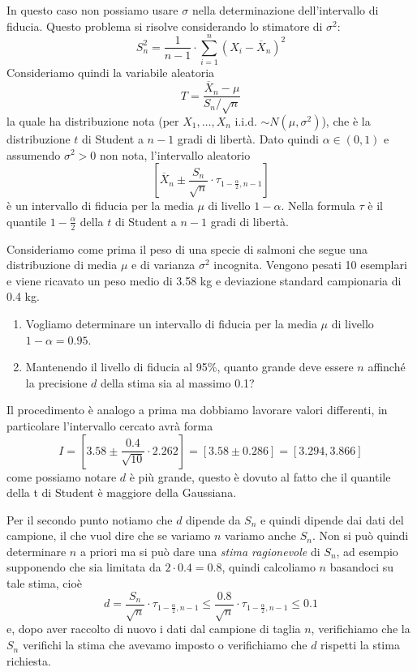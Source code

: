 \begin{proposition}
	In questo caso non possiamo usare $\sigma$ nella determinazione dell'intervallo di fiducia.
	Questo problema si risolve considerando lo stimatore di $\sigma^2$:
	\[ S_n^2 = \frac{1}{n-1} \cdot \sum_{i=1}^n \left( X_i - \overline{X}_n \right)^2 \]
	Consideriamo quindi la variabile aleatoria
	\[ T = \frac{\overline{X}_n - \mu}{S_n / \sqrt{n}} \]
	la quale ha distribuzione nota (per $X_1, \dots, X_n$ i.i.d. $\sim N(\mu, \sigma^2)$), che è la
	distribuzione $t$ di Student a $n-1$ gradi di libertà. Dato quindi $\alpha \in (0,1)$ e
	assumendo $\sigma^2 > 0$ non nota, l'intervallo aleatorio
	\[
		\left[ \overline{X}_n \pm
			\frac{S_n}{\sqrt{n}} \cdot \tau_{1 - \frac{\alpha}{2}, n-1} \right]
	\]
	è un intervallo di fiducia per la media $\mu$ di livello $1-\alpha$. Nella formula $\tau$ è il
	quantile $1-\frac{\alpha}{2}$ della $t$ di Student a $n-1$ gradi di libertà.
\end{proposition}

\begin{example}
	Consideriamo come prima il peso di una specie di salmoni che segue una distribuzione di media
	$\mu$ e di varianza $\sigma^2$ incognita. Vengono pesati 10 esemplari e viene ricavato un peso
	medio di 3.58 kg e deviazione standard campionaria di 0.4 kg.
	\begin{enumerate}
		\item Vogliamo determinare un intervallo di fiducia per la media $\mu$ di livello
		      $1 - \alpha = 0.95$.
		\item Mantenendo il livello di fiducia al 95\%, quanto grande deve essere $n$ affinché la
		      precisione $d$ della stima sia al massimo 0.1?
	\end{enumerate}
	Il procedimento è analogo a prima ma dobbiamo lavorare valori differenti, in particolare
	l'intervallo cercato avrà forma
	\[
		I = \left[ 3.58 \pm \frac{0.4}{\sqrt{10}} \cdot 2.262 \right]
		= [3.58 \pm 0.286] = [3.294, 3.866]
	\]
	come possiamo notare $d$ è più grande, questo è dovuto al fatto che il quantile della t di
	Student è maggiore della Gaussiana.

	Per il secondo punto notiamo che $d$ dipende da $S_n$ e quindi dipende dai dati del campione,
	il che vuol dire che se variamo $n$ variamo anche $S_n$. Non si può quindi determinare $n$ a
	priori ma si può dare una \emph{stima ragionevole} di $S_n$, ad esempio supponendo che sia
	limitata da $2 \cdot 0.4 = 0.8$, quindi calcoliamo $n$ basandoci su tale stima, cioè
	\[
		d = \frac{S_n}{\sqrt{n}} \cdot \tau_{1 - \frac{\alpha}{2}, n-1} \leq
		\frac{0.8}{\sqrt{n}} \cdot \tau_{1 - \frac{\alpha}{2}, n-1} \leq 0.1
	\]
	e, dopo aver raccolto di nuovo i dati dal campione di taglia $n$, verifichiamo che la $S_n$
	verifichi la stima che avevamo imposto o verifichiamo che $d$ rispetti la stima richiesta.
\end{example}

